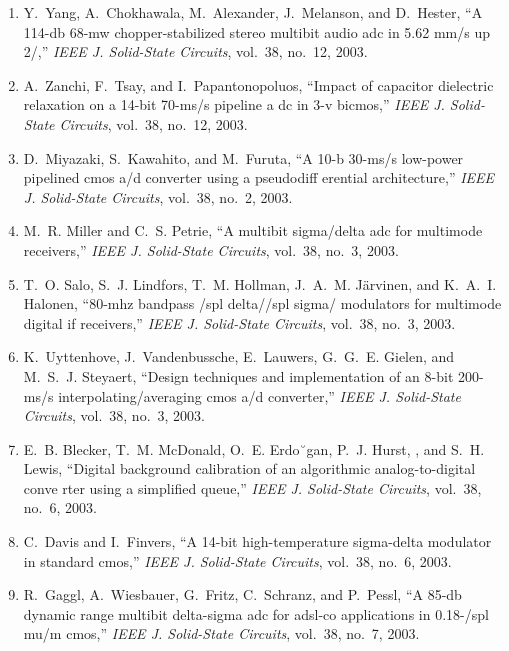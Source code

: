 \begin{enumerate}
\item
Y.~Yang, A.~Chokhawala, M.~Alexander, J.~Melanson, and D.~Hester, ``A 114-db
  68-mw chopper-stabilized stereo multibit audio adc in 5.62 mm/s up 2/,''
  \emph{{IEEE} J. Solid-State Circuits}, vol.~38, no.~12, 2003.

\item
A.~Zanchi, F.~Tsay, and I.~Papantonopoluos, ``Impact of capacitor dielectric
  relaxation on a 14-bit 70-ms/s pipeline a dc in 3-v bicmos,'' \emph{{IEEE} J.
  Solid-State Circuits}, vol.~38, no.~12, 2003.

\item
D.~Miyazaki, S.~Kawahito, and M.~Furuta, ``A 10-b 30-ms/s low-power pipelined
  cmos a/d converter using a pseudodiff erential architecture,'' \emph{{IEEE}
  J. Solid-State Circuits}, vol.~38, no.~2, 2003.

\item
M.~R. Miller and C.~S. Petrie, ``A multibit sigma/delta adc for multimode
  receivers,'' \emph{{IEEE} J. Solid-State Circuits}, vol.~38, no.~3, 2003.

\item
T.~O. Salo, S.~J. Lindfors, T.~M. Hollman, J.~A.~M. Järvinen, and K.~A.~I.
  Halonen, ``80-mhz bandpass /spl delta//spl sigma/ modulators for multimode
  digital if receivers,'' \emph{{IEEE} J. Solid-State Circuits}, vol.~38,
  no.~3, 2003.

\item
K.~Uyttenhove, J.~Vandenbussche, E.~Lauwers, G.~G.~E. Gielen, and M.~S.~J.
  Steyaert, ``Design techniques and implementation of an 8-bit 200-ms/s
  interpolating/averaging cmos a/d converter,'' \emph{{IEEE} J. Solid-State
  Circuits}, vol.~38, no.~3, 2003.

\item
E.~B. Blecker, T.~M. McDonald, O.~E. Erdo˘gan, P.~J. Hurst, , and S.~H. Lewis,
  ``Digital background calibration of an algorithmic analog-to-digital conve
  rter using a simplified queue,'' \emph{{IEEE} J. Solid-State Circuits},
  vol.~38, no.~6, 2003.

\item
C.~Davis and I.~Finvers, ``A 14-bit high-temperature sigma-delta modulator in
  standard cmos,'' \emph{{IEEE} J. Solid-State Circuits}, vol.~38, no.~6, 2003.

\item
R.~Gaggl, A.~Wiesbauer, G.~Fritz, C.~Schranz, and P.~Pessl, ``A 85-db dynamic
  range multibit delta-sigma adc for adsl-co applications in 0.18-/spl mu/m
  cmos,'' \emph{{IEEE} J. Solid-State Circuits}, vol.~38, no.~7, 2003.


\end{enumerate}
